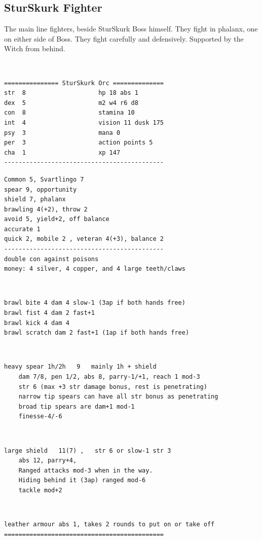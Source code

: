 \subsection*{SturSkurk Fighter}

The main line fighters, beside SturSkurk Boss himself. They fight in phalanx, one on either side of Boss. They fight carefully and defensively. Supported by the Witch from behind.

\

\goodbreak \small \begin{samepage} \begin{verbatim}
=============== SturSkurk Orc ==============
str  8                    hp 18 abs 1
dex  5                    m2 w4 r6 d8
con  8                    stamina 10
int  4                    vision 11 dusk 175
psy  3                    mana 0
per  3                    action points 5
cha  1                    xp 147
--------------------------------------------
\end{verbatim} \end{samepage} \goodbreak \begin{samepage} \begin{verbatim}
Common 5, Svartlingo 7
spear 9, opportunity
shield 7, phalanx
brawling 4(+2), throw 2
avoid 5, yield+2, off balance
accurate 1
quick 2, mobile 2 , veteran 4(+3), balance 2
--------------------------------------------
double con against poisons
money: 4 silver, 4 copper, and 4 large teeth/claws
\end{verbatim} \end{samepage}   \   \goodbreak \begin{samepage} \begin{verbatim}
brawl bite 4 dam 4 slow-1 (3ap if both hands free)
brawl fist 4 dam 2 fast+1
brawl kick 4 dam 4
brawl scratch dam 2 fast+1 (1ap if both hands free)
\end{verbatim} \end{samepage}   \   \goodbreak \begin{samepage} \begin{verbatim}
heavy spear 1h/2h   9   mainly 1h + shield
    dam 7/8, pen 1/2, abs 8, parry-1/+1, reach 1 mod-3
    str 6 (max +3 str damage bonus, rest is penetrating)
    narrow tip spears can have all str bonus as penetrating
    broad tip spears are dam+1 mod-1
    finesse-4/-6
\end{verbatim} \end{samepage}   \   \goodbreak \begin{samepage} \begin{verbatim}
large shield   11(7) ,   str 6 or slow-1 str 3
    abs 12, parry+4,
    Ranged attacks mod-3 when in the way.
    Hiding behind it (3ap) ranged mod-6
    tackle mod+2
\end{verbatim} \end{samepage}   \   \goodbreak \begin{samepage} \begin{verbatim}
leather armour abs 1, takes 2 rounds to put on or take off
============================================
\end{verbatim} \end{samepage} \normalsize

